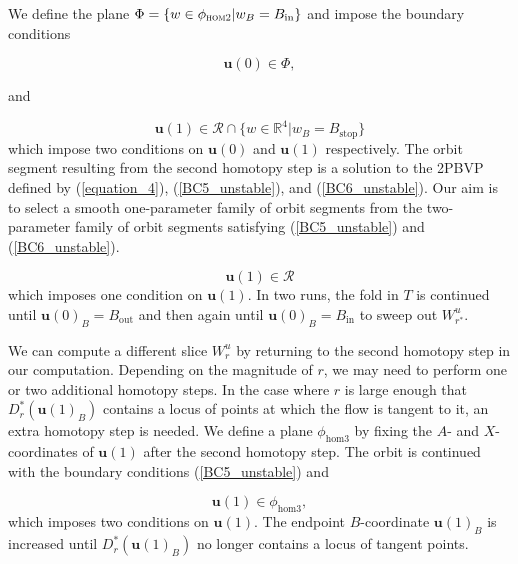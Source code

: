 \documentclass{ws-ijbc}
\begin{document}
We define the plane $\Phi = \{w \in \phi_{\textsc{hom2}}| w_B=B_{\mathrm{in}}\}$ and impose the boundary conditions

\begin{equation}
\mathbf{u}(0) \in \Phi,
\label{BC5_unstable}
\end{equation}

and 

\begin{equation}
\mathbf{u}(1) \in \mathscr{R} \cap \{ w \in \mathbb{R}^4 | w_B=B_{\mathrm{stop}}\}
\label{BC6_unstable}
\end{equation}
\noindent
which impose two conditions on $\mathbf{u}(0)$ and $\mathbf{u}(1)$ respectively.  The orbit segment resulting from the second homotopy step is a solution to the 2PBVP defined by (\ref{equation_4}), (\ref{BC5_unstable}), and (\ref{BC6_unstable}).  Our aim is to select a smooth one-parameter family of orbit segments from the two-parameter family of orbit segments satisfying (\ref{BC5_unstable}) and (\ref{BC6_unstable}). %

\begin{equation}
\mathbf{u}(1) \in \mathscr{R}
\label{BC7_unstable}
\end{equation}
\noindent
which imposes one condition on $\mathbf{u}(1)$.  In two runs, the fold in $T$ is continued until $\mathbf{u}(0)_B=B_{\mathrm{out}}$ and then again until $\mathbf{u}(0)_B=B_{\mathrm{in}}$ to sweep out $W^u_{r^*}$.

We can compute a different slice $W^u_r$ by returning to the second homotopy step in our computation.   Depending on the magnitude of $r$, we may need to perform one or two additional homotopy steps.  In the case where $r$ is large enough that $D^*_r(\mathbf{u}(1)_B)$ contains a locus of points at which the flow is tangent to it, an extra homotopy step is needed.  We define a plane $\phi_{\mathrm{hom3}}$ by fixing the $A$- and $X$-coordinates of $\mathbf{u}(1)$ after the second homotopy step.  The orbit is continued with the boundary conditions (\ref{BC5_unstable}) and

\begin{equation}
\mathbf{u}(1) \in \phi_{\mathrm{hom3}},
\label{BC8_unstable}
\end{equation}
\noindent
which imposes two conditions on $\mathbf{u}(1)$.  The endpoint $B$-coordinate $\mathbf{u}(1)_B$ is increased until $D^*_r(\mathbf{u}(1)_B)$ no longer contains a locus of tangent points.
\end{document}
